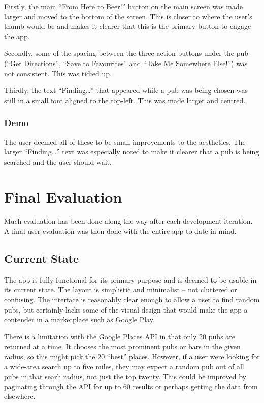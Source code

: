 \documentclass{report}
\begin{document}
Firstly, the main ``From Here to Beer!'' button on the main screen
was made larger and moved to the bottom of the screen. This is
closer to where the user's thumb would be and makes it clearer
that this is the primary button to engage the app.

Secondly, some of the spacing between the three action buttons under
the pub (``Get Directions'', ``Save to Favourites'' and ``Take Me
Somewhere Else!'') was not consistent. This was tidied up.

Thirdly, the text ``Finding\dots'' that appeared while a pub
was being chosen was still in a small font aligned to the top-left.
This was made larger and centred.

\subsection{Demo}

The user deemed all of these to be small improvements to the aesthetics.
The larger ``Finding\dots'' text was especially noted to make
it clearer that a pub is being searched and the user should wait.

\chapter{Final Evaluation}
\label{chapter:evaluation}

Much evaluation has been done along the way after each development
iteration. A final user evaluation was then done with the entire
app to date in mind.

\section{Current State}

The app is fully-functional for its primary purpose and is deemed
to be usable in its current state. The layout is simplistic and
minimalist -- not cluttered or confusing. The interface is
reasonably clear enough to allow a user to find random pubs, but
certainly lacks some of the visual design that would make the
app a contender in a marketplace such as Google Play.

There is a limitation with the Google Places API in that only 20
pubs are returned at a time. It chooses the most prominent pubs
or bars in the given radius, so this might pick the 20 ``best''
places. However, if a user were looking for a wide-area search
up to five miles, they may expect a random pub out of all
pubs in that searh radius, not just the top twenty. This could
be improved by paginating through the API for up to 60 results or
perhaps getting the data from elsewhere.
\end{document}
